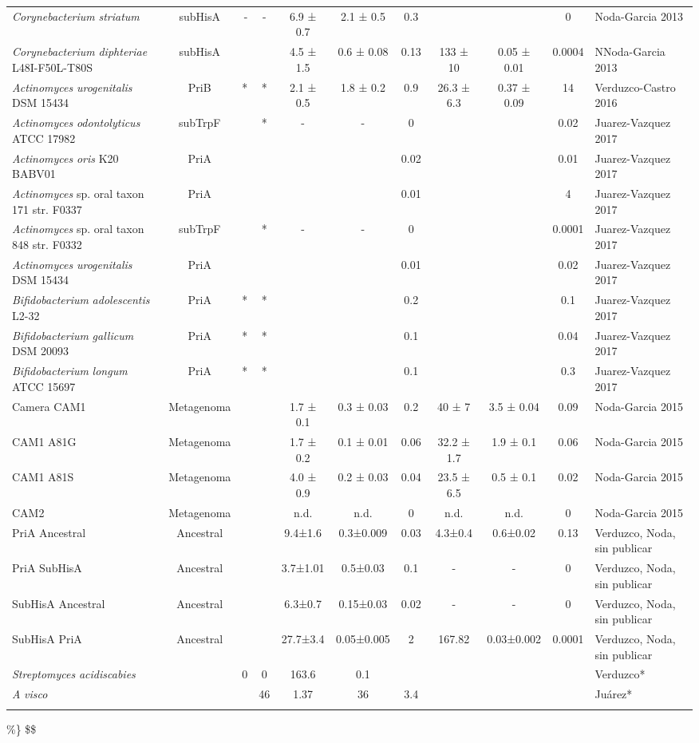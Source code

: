 \documentclass[12pt,twoside]{reedthesis}
\begin{document}
{\begin{tabular}{ l c r c c c c c c c l}
  \textit{Corynebacterium} \textit{striatum} &subHisA&-&-&6.9 ± 0.7&2.1 ± 0.5&0.3&&&0& Noda-Garcia 2013 \\ [1ex]    
  \textit{Corynebacterium} \textit{diphteriae}  L48I-F50L-T80S&subHisA&&&4.5 ± 1.5&0.6 ± 0.08&0.13&133 ± 10&0.05 ± 0.01&0.0004&NNoda-Garcia 2013\\ [1ex]    
  \textit{Actinomyces} \textit{urogenitalis} DSM 15434&PriB&*&*&2.1 ± 0.5 &1.8 ± 0.2 &0.9&26.3 ± 6.3& 0.37 ± 0.09 &14&Verduzco-Castro 2016\\ [1ex]   
  \textit{Actinomyces} \textit{odontolyticus}  ATCC 17982&subTrpF&&*&-&-&0&&&0.02&Juarez-Vazquez 2017\\ [1ex]    
  \textit{Actinomyces} \textit{oris} K20 BABV01&PriA&&&&&0.02&&&0.01&Juarez-Vazquez 2017\\ [1ex]    
  \textit{Actinomyces} sp. oral taxon 171 str. F0337&PriA&&&&&0.01&&&4&Juarez-Vazquez 2017\\ [1ex]    
  \textit{Actinomyces} sp. oral taxon 848 str. F0332&subTrpF&&*&-&-&0&&&0.0001&Juarez-Vazquez 2017\\ [1ex]    
  \textit{Actinomyces} \textit{urogenitalis} DSM 15434&PriA&&&&&0.01&&&0.02&Juarez-Vazquez 2017\\ [1ex]    
  \textit{Bifidobacterium} \textit{adolescentis} L2-32&PriA&*&*&&&0.2&&&0.1&Juarez-Vazquez 2017\\ [1ex]    
  \textit{Bifidobacterium} \textit{gallicum} DSM 20093 &PriA&*&*&&&0.1&&&0.04&Juarez-Vazquez 2017\\ [1ex]    
  \textit{Bifidobacterium} \textit{longum} ATCC 15697&PriA&*&*&&&0.1&&&0.3&Juarez-Vazquez 2017\\ [1ex]    
  Camera CAM1&Metagenoma&&&1.7 ± 0.1&0.3 ± 0.03&0.2&40 ± 7&3.5 ± 0.04&0.09&Noda-Garcia 2015\\ [1ex]    
  CAM1 A81G&Metagenoma&&&1.7 ± 0.2&0.1 ± 0.01&0.06&32.2 ± 1.7&1.9 ± 0.1&0.06&Noda-Garcia 2015\\ [1ex]    
  CAM1 A81S&Metagenoma&&&4.0 ± 0.9&0.2 ± 0.03&0.04&23.5 ± 6.5&0.5 ± 0.1&0.02&Noda-Garcia 2015\\ [1ex]    
  CAM2&Metagenoma&&&n.d.&n.d.&0&n.d.&n.d.&0&Noda-Garcia 2015\\ [1ex]    
  PriA Ancestral&Ancestral&&&9.4±1.6&0.3±0.009&0.03&4.3±0.4&0.6±0.02&0.13&Verduzco, Noda, sin publicar\\ [1ex]    
  PriA SubHisA&Ancestral&&&3.7±1.01&0.5±0.03&0.1&-&-&0&Verduzco, Noda, sin publicar\\ [1ex]    
  SubHisA Ancestral&Ancestral&&&6.3±0.7&0.15±0.03&0.02&-&-&0&Verduzco, Noda, sin publicar\\ [1ex]    
  SubHisA PriA&Ancestral&&&27.7±3.4&0.05±0.005&2&167.82&0.03±0.002&0.0001&Verduzco, Noda, sin publicar\\ [1ex]    
  \textit{Streptomyces} \textit{acidiscabies}&&0&0&163.6&0.1&&&&&Verduzco*\\ [1ex]  
  \textit{A} \textit{visco} &&&46&1.37&36&3.4&&&&Juárez*\\ [1ex]  
  
  \hline \\ [-1.5ex]
  \hline
  \end{tabular}} \%\} \$\$
  
\end{document}
